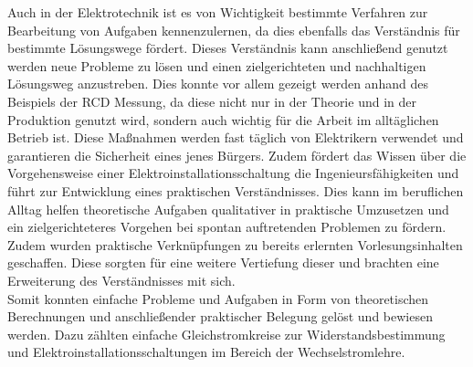 Auch in der Elektrotechnik ist es von Wichtigkeit bestimmte Verfahren zur Bearbeitung von Aufgaben kennenzulernen, da dies ebenfalls das Verständnis für 
bestimmte Lösungswege fördert. Dieses Verständnis kann anschließend genutzt werden neue Probleme zu lösen und einen zielgerichteten und nachhaltigen Lösungsweg
anzustreben. Dies konnte vor allem gezeigt werden anhand des Beispiels der RCD Messung, da diese nicht nur in der Theorie und in der Produktion genutzt wird,
sondern auch wichtig für die Arbeit im alltäglichen Betrieb ist. Diese Maßnahmen werden fast täglich von Elektrikern verwendet und garantieren die Sicherheit
eines jenes Bürgers. Zudem fördert das Wissen über die Vorgehensweise einer Elektroinstallationsschaltung die Ingenieursfähigkeiten und führt zur 
Entwicklung eines praktischen Verständnisses. Dies kann im beruflichen Alltag helfen theoretische Aufgaben qualitativer in praktische Umzusetzen und ein 
zielgerichteteres Vorgehen bei spontan auftretenden Problemen zu fördern. Zudem wurden praktische Verknüpfungen zu bereits erlernten Vorlesungsinhalten 
geschaffen. Diese sorgten für eine weitere Vertiefung dieser und brachten eine Erweiterung des Verständnisses mit sich. 
\\
Somit konnten einfache Probleme und Aufgaben in Form von theoretischen Berechnungen und anschließender praktischer Belegung gelöst und bewiesen werden. Dazu
zählten einfache Gleichstromkreise zur Widerstandsbestimmung und Elektroinstallationsschaltungen im Bereich der Wechselstromlehre.

\clearpage